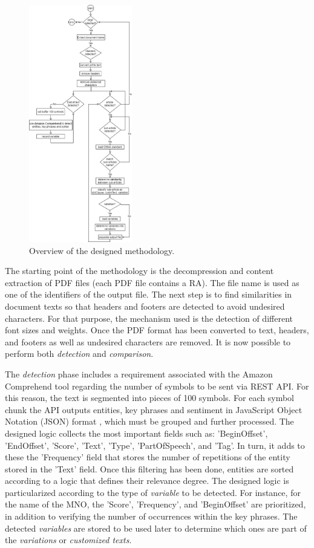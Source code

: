 \begin{figure}[htbp]
\centerline{\includegraphics[width=0.4\textwidth]{images/methodology.png}}
\caption{Overview of the designed methodology.}
\label{fig1}
\end{figure}

The starting point of the methodology is the decompression and content extraction of PDF files (each PDF file contains a RA). The file name is used as one of the identifiers of the output file. The next step is to find similarities in document texts so that headers and footers are detected to avoid undesired characters. For that purpose, the mechanism used is the detection of different font sizes and weights. Once the PDF format has been converted to text, headers, and footers as well as undesired characters are removed. It is now possible to perform both \textit{detection} and \textit{comparison}.

The \textit{detection} phase includes a requirement associated with the Amazon Comprehend tool regarding the number of symbols to be sent via REST API. For this reason, the text is segmented into pieces of 100 symbols. For each symbol chunk the API outputs entities, key phrases and sentiment in JavaScript Object Notation (JSON) format \cite{AWS2021}, which must be grouped and further processed. The designed logic collects the most important fields such as: 'BeginOffset', 'EndOffset', 'Score', 'Text', 'Type', 'PartOfSpeech', and 'Tag'. In turn, it adds to these the 'Frequency' field that stores the number of repetitions of the entity stored in the 'Text' field. Once this filtering has been done, entities are sorted according to a logic that defines their relevance degree. The designed logic is particularized according to the type of \textit{variable} to be detected. For instance, for the name of the MNO, the 'Score', 'Frequency', and 'BeginOffset' are prioritized, in addition to verifying the number of occurrences within the key phrases. The detected \textit{variables} are stored to be used later to determine which ones are part of the \textit{variations} or \textit{customized texts}.

